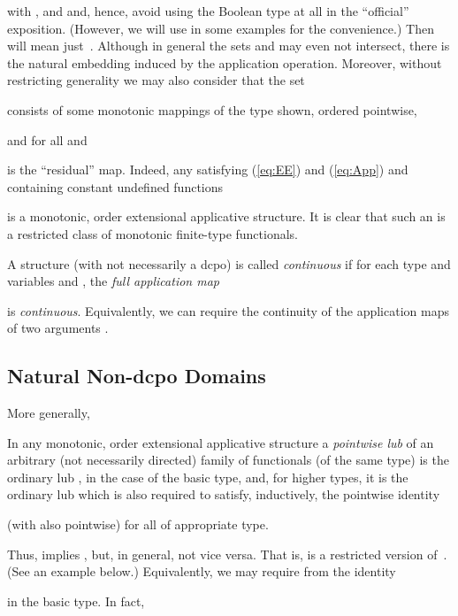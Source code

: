 \documentclass[fleqn]{LMCS}
\theoremstyle{plain}\newtheorem{satz}[thm]{Satz}
\theoremstyle{plain}\newtheorem{hyp}[thm]{Hypothesis}
\theoremstyle{plain}\newtheorem{hyps}[thm]{Hypotheses}
\theoremstyle{definition}\newtheorem{note}[thm]{Note}
\newcommand{\?}{\mbox{?}}
\begin{document}
with ,  and  
and, hence, avoid using the Boolean type  at all in the ``official'' exposition. 
(However, we will use  in some examples for the convenience.)
Then  will mean just~. 
Although in general the sets  and 
may even not intersect, 
there is the natural embedding  
induced by the application operation. 
Moreover, without restricting generality we may also consider that the set

consists of some monotonic mappings of the type shown, ordered pointwise, 

and for all  and  

is the ``residual'' map. 
Indeed, any  satisfying (\ref{eq:EE}) 
and (\ref{eq:App}) and containing constant undefined functions 
 
is a monotonic, order extensional applicative structure.  
It is clear that such an  is a restricted 
class of monotonic finite-type functionals. 
\begin{defi}\label{def:continuous-structure}A structure  (with  not necessarily a dcpo) 
is called \emph{continuous} 
if for each type  
and variables  and , the \emph{full application map} 

is \emph{{continuous}}. 
Equivalently, we can require the continuity 
of the application maps of two arguments 
. 
\end{defi}
\label{page:continuity}

\subsection{Natural Non-dcpo Domains}\label{sec:natural}

\noindent
More generally, 
\begin{defi}In any monotonic, order extensional applicative structure 
a \emph{pointwise lub} 
 of an arbitrary 
(not necessarily directed) family of functionals (of the same type) is the ordinary 
lub , in the case of the basic type, and, for higher types, it is  
the ordinary lub
which is also required to satisfy, inductively, the pointwise identity 
 
(with  also pointwise)
for all  of appropriate type.
\end{defi}

\noindent
Thus,  implies , but, in general, 
not vice versa. 
That is,  is a restricted version of~. 
(See an example below.) 
Equivalently, we may require from  the identity 
 
in the basic type.\label{page:pointwise-lub}
In fact, 
\end{document}
